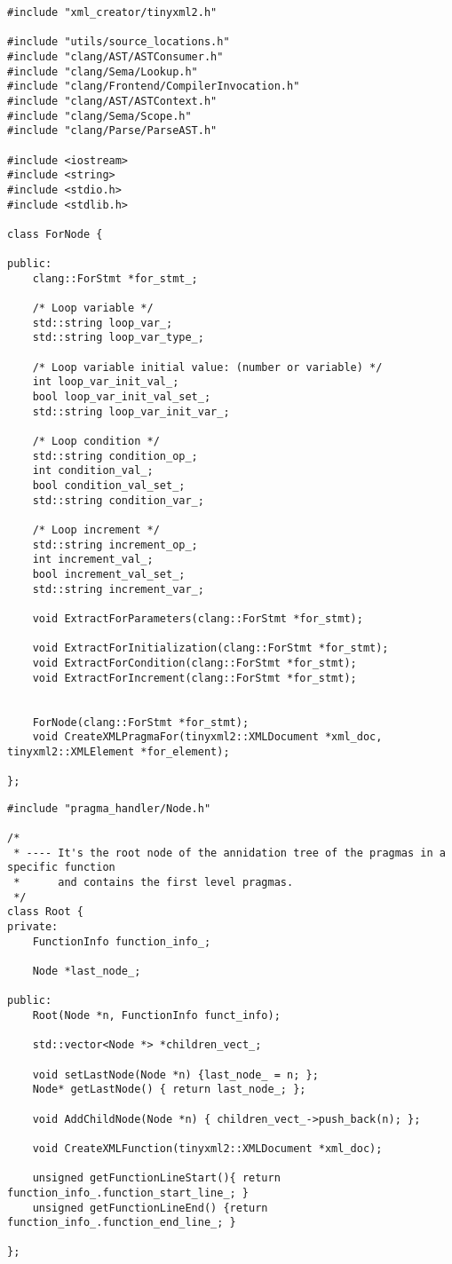 \documentclass[a4paper,11pt,twoside]{book}
\begin{document}
\begin{lstlisting}[language=CCC, caption=pragma\_handler/ForNode.h]
#include "xml_creator/tinyxml2.h"

#include "utils/source_locations.h"
#include "clang/AST/ASTConsumer.h"
#include "clang/Sema/Lookup.h"
#include "clang/Frontend/CompilerInvocation.h"
#include "clang/AST/ASTContext.h"
#include "clang/Sema/Scope.h"
#include "clang/Parse/ParseAST.h"

#include <iostream>
#include <string>
#include <stdio.h>
#include <stdlib.h>

class ForNode {

public:
	clang::ForStmt *for_stmt_;

	/* Loop variable */
	std::string loop_var_;
	std::string loop_var_type_;

	/* Loop variable initial value: (number or variable) */
	int loop_var_init_val_;
	bool loop_var_init_val_set_;
	std::string loop_var_init_var_;

	/* Loop condition */
	std::string condition_op_;
	int condition_val_;
	bool condition_val_set_;
	std::string condition_var_;

	/* Loop increment */
	std::string increment_op_;
	int increment_val_;
	bool increment_val_set_;
	std::string increment_var_;

	void ExtractForParameters(clang::ForStmt *for_stmt);

	void ExtractForInitialization(clang::ForStmt *for_stmt);
	void ExtractForCondition(clang::ForStmt *for_stmt);
	void ExtractForIncrement(clang::ForStmt *for_stmt);


	ForNode(clang::ForStmt *for_stmt);
	void CreateXMLPragmaFor(tinyxml2::XMLDocument *xml_doc, tinyxml2::XMLElement *for_element);

};
\end{lstlisting}

\begin{lstlisting}[language=CCC, caption=pragma\_handler/Root.h]
#include "pragma_handler/Node.h"

/*
 * ---- It's the root node of the annidation tree of the pragmas in a specific function 
 * 		and contains the first level pragmas.
 */
class Root {
private:	
	FunctionInfo function_info_;

	Node *last_node_;

public:
	Root(Node *n, FunctionInfo funct_info);

	std::vector<Node *> *children_vect_;

	void setLastNode(Node *n) {last_node_ = n; };
	Node* getLastNode() { return last_node_; };

	void AddChildNode(Node *n) { children_vect_->push_back(n); };

	void CreateXMLFunction(tinyxml2::XMLDocument *xml_doc);

	unsigned getFunctionLineStart(){ return function_info_.function_start_line_; }
	unsigned getFunctionLineEnd() {return function_info_.function_end_line_; }

};
\end{lstlisting}
\end{document}
